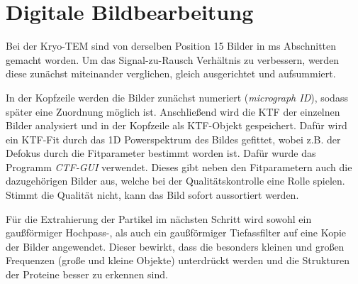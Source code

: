 \section{Digitale Bildbearbeitung} %
\label{sec:bildbearbeitung}

Bei der Kryo-TEM sind von derselben Position 15 Bilder in \unit[200]{ms} Abschnitten gemacht worden.
Um das Signal-zu-Rausch Verhältnis zu verbessern, werden diese zunächst miteinander verglichen, gleich ausgerichtet und aufsummiert.

In der Kopfzeile werden die Bilder zunächst numeriert (\textit{micrograph ID}), sodass später eine Zuordnung möglich ist.
Anschließend wird die KTF der einzelnen Bilder analysiert und in der Kopfzeile als KTF-Objekt gespeichert.
Dafür wird ein KTF-Fit durch das 1D Powerspektrum des Bildes gefittet, wobei z.B. der Defokus durch die Fitparameter bestimmt worden ist.
Dafür wurde das Programm \textit{CTF-GUI} verwendet.
Dieses gibt neben den Fitparametern auch die dazugehörigen Bilder aus, welche bei der Qualitätskontrolle eine Rolle spielen.
Stimmt die Qualität nicht, kann das Bild sofort aussortiert werden.

Für die Extrahierung der Partikel im nächsten Schritt wird sowohl ein gaußförmiger Hochpass-, als auch ein gaußförmiger Tiefassfilter auf eine Kopie der Bilder angewendet.
Dieser bewirkt, dass die besonders kleinen und großen Frequenzen (große und kleine Objekte) unterdrückt werden und die Strukturen der Proteine besser zu erkennen sind.

\FloatBarrier